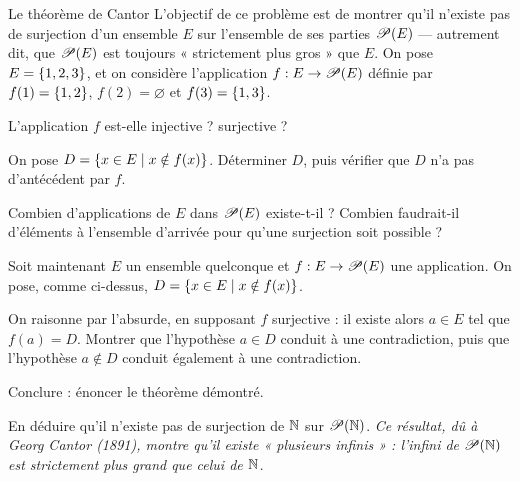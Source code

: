 \begin{exercice}[3]{Le théorème de Cantor}
L'objectif de ce problème est de montrer qu'il n'existe pas de surjection
d'un ensemble $E$ sur l'ensemble de ses parties $\mathscr{P}(E)$ — autrement
dit, que $\mathscr{P}(E)$ est toujours « strictement plus gros » que $E$.
On pose $E=\left\{1,2,3\right\}$, et on considère l'application $f:E\to\mathscr{P}(E)$
définie par $f(1)=\left\{1,2\right\}$, $f(2)=\varnothing$ et $f(3)=\left\{1,3\right\}$.
\begin{questions}
  \item L'application $f$ est-elle injective ? surjective ?
  \item On pose $D=\left\{x\in E \mid x\notin f(x)\right\}$. Déterminer $D$, puis
    vérifier que $D$ n'a pas d'antécédent par $f$.
  \item Combien d'applications de $E$ dans $\mathscr{P}(E)$ existe-t-il ?
    Combien faudrait-il d'éléments à l'ensemble d'arrivée pour qu'une
    surjection soit possible ?
\end{questions}
Soit maintenant $E$ un ensemble quelconque et $f:E\to\mathscr{P}(E)$ une
application. On pose, comme ci-dessus,
$D=\left\{x\in E \mid x\notin f(x)\right\}$.
\begin{questions}[resume]
  \item On raisonne par l'absurde, en supposant $f$ surjective : il existe
    alors $a\in E$ tel que $f(a)=D$. Montrer que l'hypothèse $a\in D$ conduit
    à une contradiction, puis que l'hypothèse $a\notin D$ conduit également à
    une contradiction.
  \item Conclure : énoncer le théorème démontré.
  \item En déduire qu'il n'existe pas de surjection de $\mathbb{N}$ sur
    $\mathscr{P}(\mathbb{N})$. \emph{Ce résultat, dû à Georg Cantor (1891), montre qu'il
    existe « plusieurs infinis » : l'infini de $\mathscr{P}(\mathbb{N})$ est strictement
    plus grand que celui de $\mathbb{N}$.}
\end{questions}
\end{exercice}



